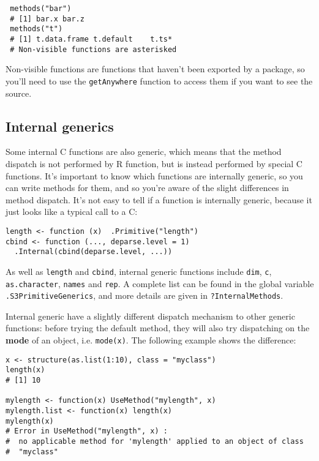 \begin{verbatim}
 methods("bar")
 # [1] bar.x bar.z
 methods("t")
 # [1] t.data.frame t.default    t.ts*       
 # Non-visible functions are asterisked
\end{verbatim}

Non-visible functions are functions that haven't been exported by a
package, so you'll need to use the \texttt{getAnywhere} function to
access them if you want to see the source.

\subsection{Internal generics}

Some internal C functions are also generic, which means that the method
dispatch is not performed by R function, but is instead performed by
special C functions. It's important to know which functions are
internally generic, so you can write methods for them, and so you're
aware of the slight differences in method dispatch. It's not easy to
tell if a function is internally generic, because it just looks like a
typical call to a C:

\begin{verbatim}
length <- function (x)  .Primitive("length")
cbind <- function (..., deparse.level = 1) 
  .Internal(cbind(deparse.level, ...))
\end{verbatim}

As well as \texttt{length} and \texttt{cbind}, internal generic
functions include \texttt{dim}, \texttt{c}, \texttt{as.character},
\texttt{names} and \texttt{rep}. A complete list can be found in the
global variable \texttt{.S3PrimitiveGenerics}, and more details are
given in \texttt{?InternalMethods}.

Internal generic have a slightly different dispatch mechanism to other
generic functions: before trying the default method, they will also try
dispatching on the \textbf{mode} of an object, i.e. \texttt{mode(x)}.
The following example shows the difference:

\begin{verbatim}
x <- structure(as.list(1:10), class = "myclass")
length(x)
# [1] 10

mylength <- function(x) UseMethod("mylength", x)
mylength.list <- function(x) length(x)
mylength(x)
# Error in UseMethod("mylength", x) : 
#  no applicable method for 'mylength' applied to an object of class
#  "myclass"
\end{verbatim}

